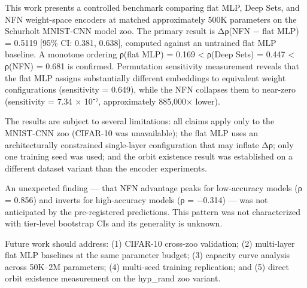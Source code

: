 
This work presents a controlled benchmark comparing flat MLP, Deep Sets, and NFN weight-space encoders at matched approximately 500K parameters on the Schurholt MNIST-CNN model zoo. The primary result is Δρ(NFN − flat MLP) = 0.5119 [95\% CI: 0.381, 0.638], computed against an untrained flat MLP baseline. A monotone ordering ρ(flat MLP) = 0.169 < ρ(Deep Sets) = 0.447 < ρ(NFN) = 0.681 is confirmed. Permutation sensitivity measurement reveals that the flat MLP assigns substantially different embeddings to equivalent weight configurations (sensitivity = 0.649), while the NFN collapses them to near-zero (sensitivity = 7.34 × 10⁻⁷, approximately 885,000× lower).

The results are subject to several limitations: all claims apply only to the MNIST-CNN zoo (CIFAR-10 was unavailable); the flat MLP uses an architecturally constrained single-layer configuration that may inflate Δρ; only one training seed was used; and the orbit existence result was established on a different dataset variant than the encoder experiments.

An unexpected finding — that NFN advantage peaks for low-accuracy models (ρ = 0.856) and inverts for high-accuracy models (ρ = −0.314) — was not anticipated by the pre-registered predictions. This pattern was not characterized with tier-level bootstrap CIs and its generality is unknown.

Future work should address: (1) CIFAR-10 cross-zoo validation; (2) multi-layer flat MLP baselines at the same parameter budget; (3) capacity curve analysis across 50K–2M parameters; (4) multi-seed training replication; and (5) direct orbit existence measurement on the hyp_rand zoo variant.


